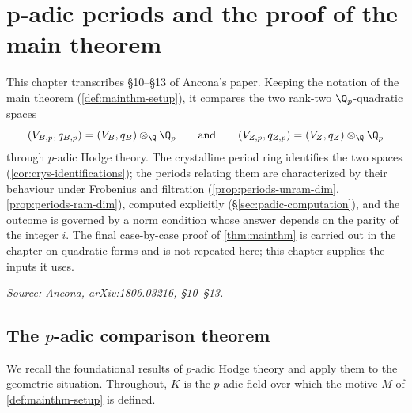 \chapter{p-adic periods and the proof of the main theorem}

\providecommand{\REP}{\mathrm{Rep}}
\providecommand{\SO}{\mathrm{SO}}

This chapter transcribes \S10--\S13 of Ancona's paper. Keeping the notation of
the main theorem (\cref{def:mainthm-setup}), it compares the two rank-two
\(\Q_p\)-quadratic spaces
\[(V_{B,p}, q_{B,p}) = (V_B, q_B) \otimes_\Q \Q_p \qquad \text{and} \qquad
  (V_{Z,p}, q_{Z,p}) = (V_Z, q_Z) \otimes_\Q \Q_p\]
through \(p\)-adic Hodge theory. The crystalline period ring identifies the two
spaces (\cref{cor:crys-identifications}); the periods relating them are
characterized by their behaviour under Frobenius and filtration
(\cref{prop:periods-unram-dim}, \cref{prop:periods-ram-dim}), computed
explicitly (\S\ref{sec:padic-computation}), and the outcome is governed by a
norm condition whose answer depends on the parity of the integer \(i\). The
final case-by-case proof of \cref{thm:mainthm} is carried out in the chapter on
quadratic forms and is not repeated here; this chapter supplies the inputs it
uses.

\textit{Source: Ancona, arXiv:1806.03216, \S10--\S13.}

\section{The $p$-adic comparison theorem}

We recall the foundational results of \(p\)-adic Hodge theory and apply them to
the geometric situation. Throughout, \(K\) is the \(p\)-adic field over which the
motive \(M\) of \cref{def:mainthm-setup} is defined.

